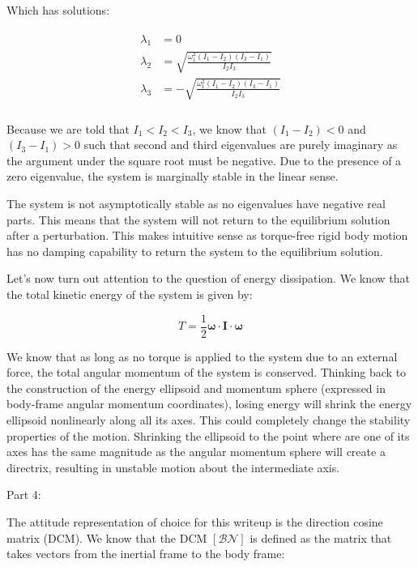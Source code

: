 \documentclass[
]{article}
\begin{document}
Which has solutions:

\[\begin{aligned}
\begin{aligned}
    \lambda_1 &= 0 \\
    \lambda_2 &= \sqrt{\frac{\omega_1^2 \left(I_1 - I_2\right) \left(I_3 - I_1\right)}{I_2 I_3}} \\
    \lambda_3 &= -\sqrt{\frac{\omega_1^2 \left(I_1 - I_2\right) \left(I_3 - I_1\right)}{I_2 I_3}} \\
\end{aligned}
\end{aligned}\]

Because we are told that \(I_1 < I_2 < I_3\), we know that
\(\left(I_1 - I_2\right) < 0\) and \(\left(I_3 - I_1\right) > 0\) such
that second and third eigenvalues are purely imaginary as the argument
under the square root must be negative. Due to the presence of a zero
eigenvalue, the system is marginally stable in the linear sense.

The system is not asymptotically stable as no eigenvalues have negative
real parts. This means that the system will not return to the
equilibrium solution after a perturbation. This makes intuitive sense as
torque-free rigid body motion has no damping capability to return the
system to the equilibrium solution.

Let's now turn out attention to the question of energy dissipation. We
know that the total kinetic energy of the system is given by:

\[T = \frac{1}{2} \boldsymbol{\omega} \cdot \boldsymbol{I} \cdot \boldsymbol{\omega}\]

We know that as long as no torque is applied to the system due to an
external force, the total angular momentum of the system is conserved.
Thinking back to the construction of the energy ellipsoid and momentum
sphere (expressed in body-frame angular momentum coordinates), losing
energy will shrink the energy ellipsoid nonlinearly along all its axes.
This could completely change the stability properties of the motion.
Shrinking the ellipsoid to the point where are one of its axes has the
same magnitude as the angular momentum sphere will create a directrix,
resulting in unstable motion about the intermediate axis.

Part 4:

The attitude representation of choice for this writeup is the direction
cosine matrix (DCM). We know that the DCM \(\left[\mathcal{BN}\right]\)
is defined as the matrix that takes vectors from the inertial frame to
the body frame:
\end{document}

